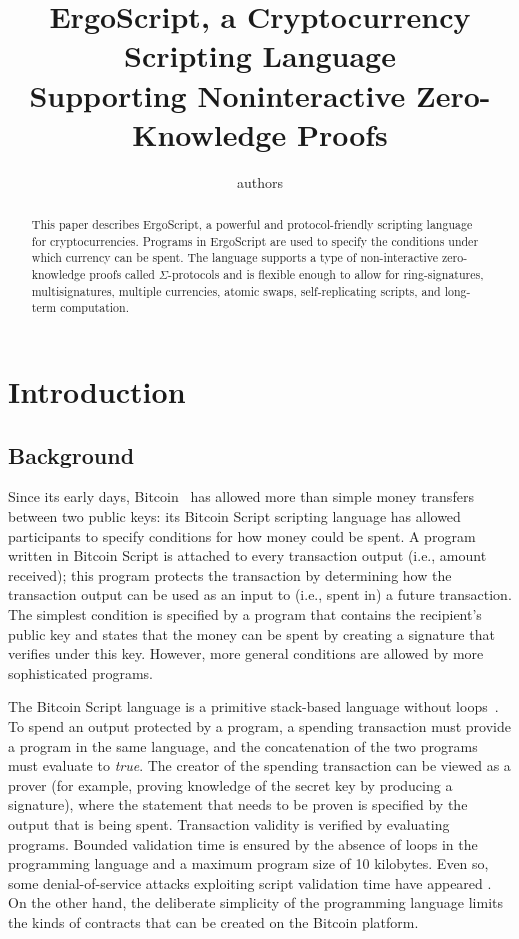 \documentclass[11pt]{article}
\newcommand{\langname}{ErgoScript\xspace}
\begin{document}
\title{\langname, a Cryptocurrency Scripting Language\\Supporting Noninteractive Zero-Knowledge Proofs}

\author{authors}


\maketitle


\begin{abstract}
This paper describes \langname, a powerful and protocol-friendly scripting language for cryptocurrencies. Programs in \langname are used to specify the conditions under which currency can be spent. The language supports a type of non-interactive zero-knowledge proofs called $\Sigma$-protocols and is flexible enough to allow for ring-signatures, multisignatures, multiple currencies, atomic swaps, self-replicating scripts, and long-term computation.
\end{abstract}



\section{Introduction}
\subsection{Background}

Since its early days, Bitcoin~\cite{Nak08} has allowed more than simple money transfers between two public keys: its Bitcoin Script scripting language has allowed participants to specify conditions for how money could be spent. A program written in Bitcoin Script is attached to every transaction output (i.e., amount received); this program protects the transaction by determining how the transaction output can be used as an input to (i.e., spent in) a future transaction. The simplest condition is specified by a program that contains the recipient's public key and states that the money can be spent by creating a signature that verifies under this key.  However, more general conditions are allowed by more sophisticated programs. 

The Bitcoin Script language is a primitive stack-based language without loops~\cite{bscript}. To spend an output protected by a program, a spending transaction must provide a program in the same language, and the concatenation of the two programs must evaluate to \emph{true}. The creator of the spending transaction can be viewed as a prover (for example, proving knowledge of the secret key by producing a signature), where the statement that needs to be proven is specified by the output that is being spent. Transaction validity is verified by evaluating programs. Bounded validation time is ensured by the absence of loops in the programming language and a maximum program size of 10 kilobytes. Even so, some denial-of-service attacks exploiting script validation time have appeared \cite{bitcoindos, fivehrs, ethattacks}. On the other hand, the deliberate simplicity of the programming language limits the kinds of contracts that can be created on the Bitcoin platform.
\end{document}
